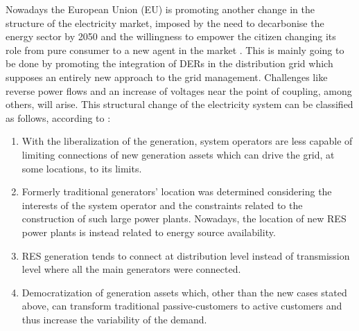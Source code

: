Nowadays the European Union (EU) is promoting another change in the structure of the electricity market, imposed by the need to decarbonise the energy sector by 2050 and the willingness to empower the citizen changing its role from pure consumer to a new agent in the market \cite{Hancher2017}. This is mainly going to be done by promoting the integration of DERs in the distribution grid which supposes an entirely new approach to the grid management. Challenges like reverse power flows and an increase of voltages near the point of coupling, among others, will arise. This structural change of the electricity system can be classified as follows, according to \cite{Bollen2011}:

\begin{enumerate}
\item With the liberalization of the generation, system operators are less capable of limiting
connections of new generation assets which can drive the grid, at some locations, to its
limits.
\item Formerly traditional generators' location was determined considering the interests of the system
operator and the constraints related to the construction of such large power plants.
Nowadays, the location of new RES power plants is instead related to energy source availability.
\item RES generation tends to connect at distribution level instead of transmission level where
all the main generators were connected.
\item Democratization of generation assets which, other than the new cases stated above, can
transform traditional passive-customers to active customers and thus increase the variability
of the demand.

\end{enumerate}

